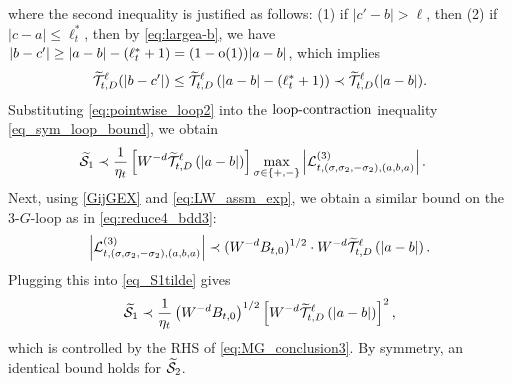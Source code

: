 where the second inequality is justified as follows: (1) if $|c'-b|>\ell$, then  (2) if $|c-a|\le \ell_t^*$, then by \eqref{eq:largea-b}, we have $|b-c'|\ge |a-b|-(\ell_t^*+1) =(1-\operatorname{o}(1))|a-b|$, which implies 
\[ \widetilde{\mathcal T}_{t,D}^{\ell}(|b-c'|) \le \widetilde{\mathcal T}_{t,D}^{\ell}\left({|a-b|-(\ell_t^*+1)}\right) \prec \widetilde{\mathcal T}_{t,D}^{\ell}(|a-b|). \]
Substituting \eqref{eq:pointwise_loop2} into the $\text{loop-contraction}$ inequality \eqref{eq_sym_loop_bound}, we obtain  
\begin{align}
    \widetilde{\mathcal{S}}_1 &\prec  \frac{1}{\eta_t} \left[W^{-d} \widetilde{\mathcal{T}}^{\ell}_{t,D}\left({|a-b|}\right)\right] \max_{\sigma\in\{+,-\}}\left|\mathcal{L}^{(3)}_{t, (\sigma,\sigma_2,-\sigma_2), (a,b,a)}\right|.\label{eq_S1tilde}
\end{align}
Next, using \eqref{GijGEX} and \eqref{eq:LW_assm_exp}, we obtain a similar bound on the 3-$G$-loop as in \eqref{eq:reduce4_bdd3}:
\[\left|\mathcal{L}^{(3)}_{t, (\sigma,\sigma_2,-\sigma_2), (a,b,a)}\right|\prec (W^{-d}B_{t,0})^{1/2}\cdot W^{-d} \widetilde{\mathcal{T}}^{\ell}_{t,D}\left({|a-b|}\right).\]
Plugging this into \eqref{eq_S1tilde} gives
\begin{equation}\label{eq:boundwtS_1}
    \widetilde{\mathcal{S}}_1 \prec \frac{1}{\eta_t} \left(W^{-d}B_{t,0}\right)^{1/2}\left[W^{-d} \widetilde{\mathcal{T}}^{\ell}_{t,D}\left({|a-b|}\right)\right]^2 , 
\end{equation}
which is controlled by the RHS of \eqref{eq:MG_conclusion3}. By symmetry, an identical bound holds for $\widetilde {\mathcal S}_2$.



